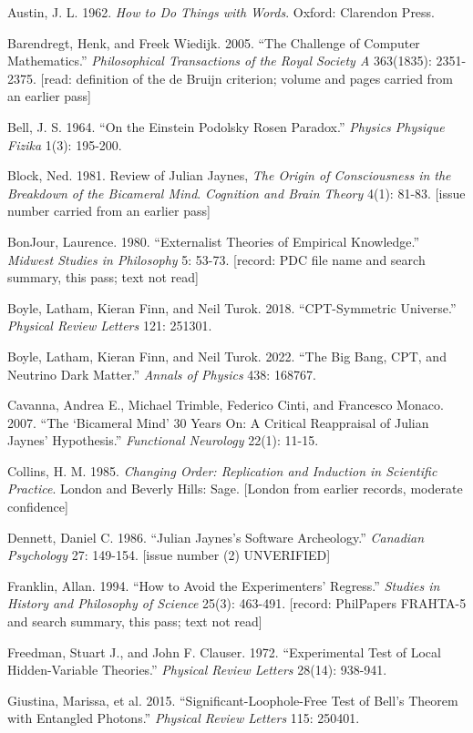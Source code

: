 \documentclass[11pt]{article}
\begin{document}
Austin, J. L. 1962. \emph{How to Do Things with Words}. Oxford: Clarendon Press.

Barendregt, Henk, and Freek Wiedijk. 2005. ``The Challenge of Computer Mathematics.'' \emph{Philosophical Transactions of the Royal Society A} 363(1835): 2351-2375. [read: definition of the de Bruijn criterion; volume and pages carried from an earlier pass]

Bell, J. S. 1964. ``On the Einstein Podolsky Rosen Paradox.'' \emph{Physics Physique Fizika} 1(3): 195-200.

Block, Ned. 1981. Review of Julian Jaynes, \emph{The Origin of Consciousness in the Breakdown of the Bicameral Mind}. \emph{Cognition and Brain Theory} 4(1): 81-83. [issue number carried from an earlier pass]

BonJour, Laurence. 1980. ``Externalist Theories of Empirical Knowledge.'' \emph{Midwest Studies in Philosophy} 5: 53-73. [record: PDC file name and search summary, this pass; text not read]

Boyle, Latham, Kieran Finn, and Neil Turok. 2018. ``CPT-Symmetric Universe.'' \emph{Physical Review Letters} 121: 251301.

Boyle, Latham, Kieran Finn, and Neil Turok. 2022. ``The Big Bang, CPT, and Neutrino Dark Matter.'' \emph{Annals of Physics} 438: 168767.

Cavanna, Andrea E., Michael Trimble, Federico Cinti, and Francesco Monaco. 2007. ``The `Bicameral Mind' 30 Years On: A Critical Reappraisal of Julian Jaynes' Hypothesis.'' \emph{Functional Neurology} 22(1): 11-15.

Collins, H. M. 1985. \emph{Changing Order: Replication and Induction in Scientific Practice}. London and Beverly Hills: Sage. [London from earlier records, moderate confidence]

Dennett, Daniel C. 1986. ``Julian Jaynes's Software Archeology.'' \emph{Canadian Psychology} 27: 149-154. [issue number (2) UNVERIFIED]

Franklin, Allan. 1994. ``How to Avoid the Experimenters' Regress.'' \emph{Studies in History and Philosophy of Science} 25(3): 463-491. [record: PhilPapers FRAHTA-5 and search summary, this pass; text not read]

Freedman, Stuart J., and John F. Clauser. 1972. ``Experimental Test of Local Hidden-Variable Theories.'' \emph{Physical Review Letters} 28(14): 938-941.

Giustina, Marissa, et al. 2015. ``Significant-Loophole-Free Test of Bell's Theorem with Entangled Photons.'' \emph{Physical Review Letters} 115: 250401.
\end{document}
